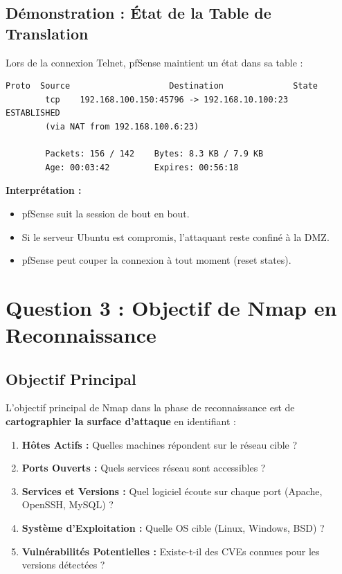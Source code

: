 \documentclass[12pt,a4paper,openany]{report}
\begin{document}
	\subsection{Démonstration : État de la Table de Translation}
	Lors de la connexion Telnet, pfSense maintient un état dans sa table :
	
	\begin{lstlisting}[caption=Extrait de la table d'états pfSense (simulé)]
		Proto  Source                    Destination              State
		tcp    192.168.100.150:45796 -> 192.168.10.100:23       ESTABLISHED
		(via NAT from 192.168.100.6:23)
		
		Packets: 156 / 142    Bytes: 8.3 KB / 7.9 KB
		Age: 00:03:42         Expires: 00:56:18
	\end{lstlisting}
	
	\textbf{Interprétation :}
	\begin{itemize}
		\item pfSense suit la session de bout en bout.
		\item Si le serveur Ubuntu est compromis, l'attaquant reste confiné à la DMZ.
		\item pfSense peut couper la connexion à tout moment (reset states).
	\end{itemize}
	
	\section{Question 3 : Objectif de Nmap en Reconnaissance}
	
	\subsection{Objectif Principal}
	L'objectif principal de Nmap dans la phase de reconnaissance est de \textbf{cartographier la surface d'attaque} en identifiant :
	
	\begin{enumerate}
		\item \textbf{Hôtes Actifs :} Quelles machines répondent sur le réseau cible ?
		\item \textbf{Ports Ouverts :} Quels services réseau sont accessibles ?
		\item \textbf{Services et Versions :} Quel logiciel écoute sur chaque port (Apache, OpenSSH, MySQL) ?
		\item \textbf{Système d'Exploitation :} Quelle OS cible (Linux, Windows, BSD) ?
		\item \textbf{Vulnérabilités Potentielles :} Existe-t-il des CVEs connues pour les versions détectées ?
	\end{enumerate}
	
\end{document}
